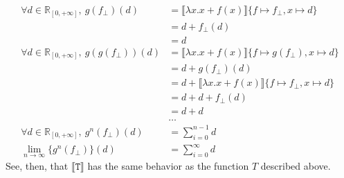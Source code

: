 \documentclass{westhesis}
\newcommand{\R}{\mathbb{R}}
\begin{document}
 \begin{align*}
 \forall d \in \R_{[0,+\infty]}, \ g(f_{\perp})(d) &= \llbracket \lambda x.x + f(x)\rrbracket\{f \mapsto f_{\perp}, x \mapsto d\} \\
 &= d + f_{\perp}(d) \\
 &= d  \\
 \forall d \in \R_{[0,+\infty]}, \ g(g(f_{\perp}))(d) &= \llbracket \lambda x.x + f(x)\rrbracket\{f \mapsto g(f_{\perp}),x\mapsto d\} \\
 &= d + g(f_\perp)(d) \\
 &= d + \llbracket \lambda x.x + f(x)\rrbracket\{f\mapsto f_\perp, x\mapsto d\} \\
 &= d + d + f_\perp(d) \\
 &= d + d \\ 
 &\ldots \\
 \forall d \in \R_{[0,+\infty]}, \ g^n(f_{\perp})(d) &= \sum_{i=0}^{n-1} d \\
 \lim_{n \to \infty}\{g^n (f_{\perp})\}(d) &= \sum_{i=0}^{\infty} d 
 \end{align*}
 See, then, that $\llbracket \texttt{T} \rrbracket$ has the same behavior as the function $T$ described above.
\end{document}
